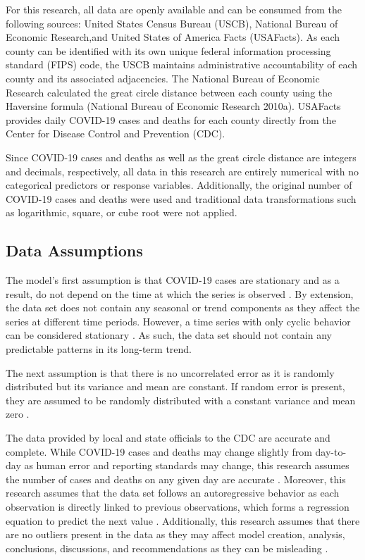 For this research, all data are openly available and can be consumed from the following sources: United States Census Bureau (USCB), National Bureau of Economic Research,and United States of America Facts (USAFacts). As each county can be identified with its own unique federal information processing standard (FIPS) code, the USCB maintains administrative accountability of each county and its associated adjacencies. The National Bureau of Economic Research calculated the great circle distance between each county using the Haversine formula (National Bureau of Economic Research 2010a). USAFacts provides daily COVID-19 cases and deaths for each county directly from the Center for Disease Control and Prevention (CDC).

Since {COVID-19} cases and deaths as well as the great circle distance are integers and decimals, respectively, all data in this research are entirely numerical with no categorical predictors or response variables.  Additionally, the original number of {COVID-19} cases and deaths were used and traditional data transformations such as logarithmic, square, or cube root were not applied.

\subsection{Data Assumptions}\label{Data Assumptions}
The model's first assumption is that {COVID-19} cases are stationary and as a result, do not depend on the time at which the series is observed \cite{hyndman2018forecasting}.  By extension, the data set does not contain any seasonal or trend components as they affect the series at different time periods.  However, a time series with only cyclic behavior can be considered stationary \cite{hyndman2018forecasting}.  As such, the data set should not contain any predictable patterns in its long-term trend.

The next assumption is that there is no uncorrelated error as it is randomly distributed but its variance and mean are constant.  If random error is present, they are assumed to be randomly distributed with a constant variance and mean zero \cite{TimeSeriesAssumptions}. 

The data provided by local and state officials to the {CDC} are accurate and complete.  While {COVID-19} cases and deaths may change slightly from day-to-day as human error and reporting standards may change, this research assumes the number of cases and deaths on any given day are accurate \cite{CDCFAQ}.  Moreover, this research assumes that the data set follows an autoregressive behavior as each observation is directly linked to previous observations, which forms a regression equation to predict the next value \cite{autoregression}.  Additionally, this research assumes that there are no outliers present in the data as they may affect model creation, analysis, conclusions, discussions, and recommendations as they can be misleading \cite{statisticsbyjim}. 

